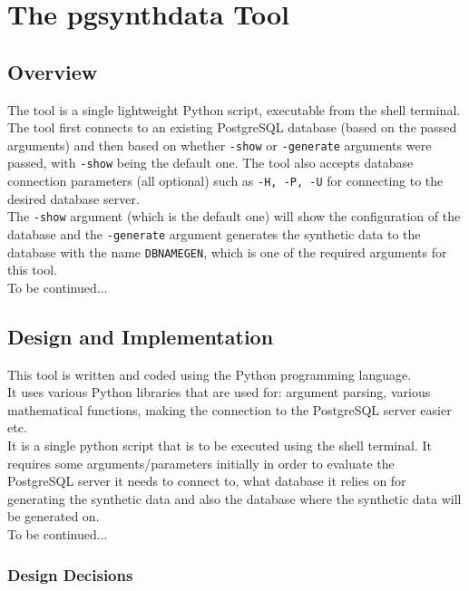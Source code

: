 \chapter{The pgsynthdata Tool}
\label{ch:pgsynthdata_tool}
\section{Overview}
The tool is a single lightweight Python script, executable from the shell terminal. The tool first connects to an existing PostgreSQL database (based on the passed arguments) and then based on whether \texttt{-show} or \texttt{-generate} arguments were passed, with \texttt{-show} being the default one. The tool also accepts database connection parameters (all optional) such as \texttt{-H, -P, -U} for connecting to the desired database server.\\
The \texttt{-show} argument (which is the default one) will show the configuration of the database and the \texttt{-generate} argument generates the synthetic data to the database with the name \texttt{DBNAMEGEN}, which is one of the required arguments for this tool.\\
To be continued...
\section{Design and Implementation}
This tool is written and coded using the Python programming language.\\
It uses various Python libraries that are used for: argument parsing, various mathematical functions, making the connection to the PostgreSQL server easier etc.\\
It is a single python script that is to be executed using the shell terminal. It requires some arguments/parameters initially in order to evaluate the PostgreSQL server it needs to connect to, what database it relies on for generating the synthetic data and also the database where the synthetic data will be generated on.\\
To be continued...
\subsection{Design Decisions}
